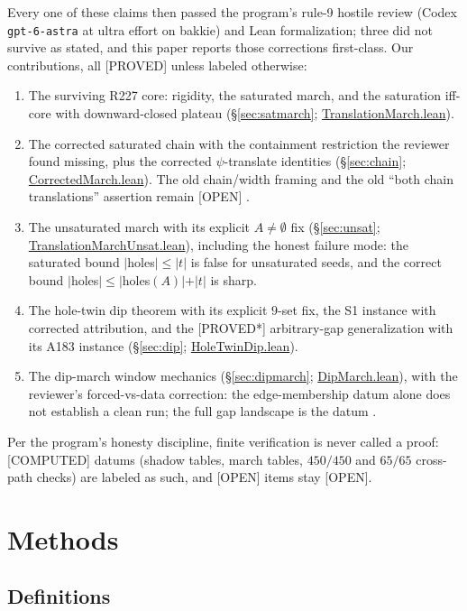 \documentclass[11pt,a4paper]{article}
\theoremstyle{definition}
\begin{document}
Every one of these claims then passed the program's rule-9 hostile
review (Codex \texttt{gpt-6-astra} at ultra effort on bakkie) and
Lean formalization; three did not survive as stated, and this paper
reports those corrections first-class. Our contributions, all
[PROVED] unless labeled otherwise:
\begin{enumerate}
\item The surviving R227 core: rigidity, the saturated march, and the
  saturation iff-core with downward-closed plateau
  (\S\ref{sec:satmarch}; \url{TranslationMarch.lean}).
\item The corrected saturated chain with the containment restriction
  the reviewer found missing, plus the corrected $\psi$-translate
  identities (\S\ref{sec:chain}; \url{CorrectedMarch.lean}). The
  old chain/width framing and the old ``both chain translations''
  assertion remain [OPEN] \cite{D234}.
\item The unsaturated march with its explicit $A\ne\emptyset$ fix
  (\S\ref{sec:unsat}; \url{TranslationMarchUnsat.lean}), including
  the honest failure mode: the saturated bound $|$holes$|\le|t|$ is
  false for unsaturated seeds, and the correct bound
  $|$holes$|\le|$holes$(A)|+|t|$ is sharp.
\item The hole-twin dip theorem with its explicit $9$-set fix, the
  S1 instance with corrected attribution, and the [PROVED*] arbitrary-gap
  generalization with its A183 instance
  (\S\ref{sec:dip}; \url{HoleTwinDip.lean}).
\item The dip-march window mechanics (\S\ref{sec:dipmarch};
  \url{DipMarch.lean}), with the reviewer's forced-vs-data
  correction: the edge-membership datum alone does not establish a
  clean run; the full gap landscape is the datum \cite{D262}.
\end{enumerate}
Per the program's honesty discipline, finite verification is never
called a proof: [COMPUTED] datums (shadow tables, march tables,
$450/450$ and $65/65$ cross-path checks) are labeled as such, and
[OPEN] items stay [OPEN].

\section{Methods}

\subsection{Definitions}
\label{sec:defs}
\end{document}
